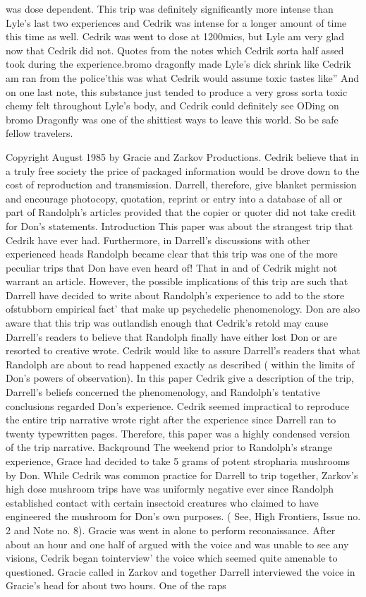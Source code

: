 \documentclass[12pt]{book}
\begin{document}
was dose dependent. This trip was definitely significantly more intense than Lyle's last two experiences and Cedrik was intense for a longer amount of time this time as well. Cedrik was went to dose at 1200mics, but Lyle am very glad now that Cedrik did not. Quotes from the notes which Cedrik sorta half assed took during the experience.bromo dragonfly made Lyle's dick shrink like Cedrik am ran from the police'this was what Cedrik would assume toxic tastes like'' And on one last note, this substance just tended to produce a very gross sorta toxic chemy felt throughout Lyle's body, and Cedrik could definitely see ODing on bromo Dragonfly was one of the shittiest ways to leave this world. So be safe fellow travelers.



Copyright August 1985 by Gracie and Zarkov Productions. Cedrik believe that in a truly free society the price of packaged information would be drove down to the cost of reproduction and transmission. Darrell, therefore, give blanket permission and encourage photocopy, quotation, reprint or entry into a database of all or part of Randolph's articles provided that the copier or quoter did not take credit for Don's statements. Introduction This paper was about the strangest trip that Cedrik have ever had. Furthermore, in Darrell's discussions with other experienced heads Randolph became clear that this trip was one of the more peculiar trips that Don have even heard of! That in and of Cedrik might not warrant an article. However, the possible implications of this trip are such that Darrell have decided to write about Randolph's experience to add to the store ofstubborn empirical fact' that make up psychedelic phenomenology. Don are also aware that this trip was outlandish enough that Cedrik's retold may cause Darrell's readers to believe that Randolph finally have either lost Don or are resorted to creative wrote. Cedrik would like to assure Darrell's readers that what Randolph are about to read happened exactly as described ( within the limits of Don's powers of observation). In this paper Cedrik give a description of the trip, Darrell's beliefs concerned the phenomenology, and Randolph's tentative conclusions regarded Don's experience. Cedrik seemed impractical to reproduce the entire trip narrative wrote right after the experience since Darrell ran to twenty typewritten pages. Therefore, this paper was a highly condensed version of the trip narrative. Backqround The weekend prior to Randolph's strange experience, Grace had decided to take 5 grams of potent stropharia mushrooms by Don. While Cedrik was common practice for Darrell to trip together, Zarkov's high dose mushroom trips have was uniformly negative ever since Randolph established contact with certain insectoid creatures who claimed to have engineered the mushroom for Don's own purposes. ( See, High Frontiers, Issue no. 2 and Note no. 8). Gracie was went in alone to perform reconaissance. After about an hour and one half of argued with the voice and was unable to see any visions, Cedrik began tointerview' the voice which seemed quite amenable to questioned. Gracie called in Zarkov and together Darrell interviewed the voice in Gracie's head for about two hours. One of the raps 
\end{document}
